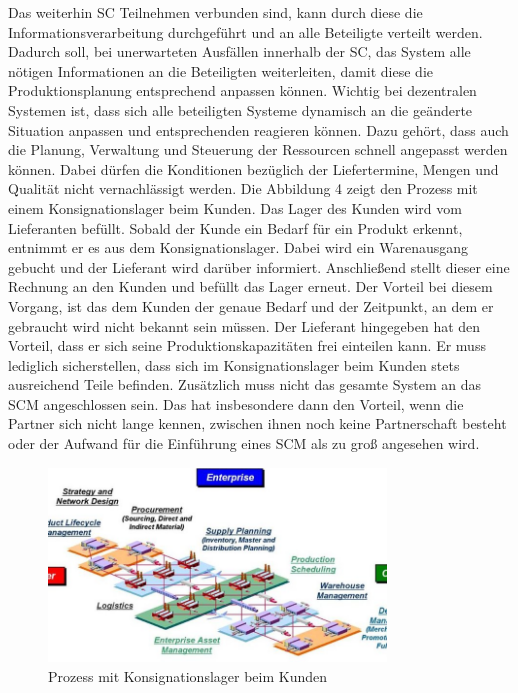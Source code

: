 Das weiterhin \ac{SC} Teilnehmen verbunden sind, kann durch diese die Informationsverarbeitung durchgeführt und an alle Beteiligte verteilt werden. Dadurch soll, bei unerwarteten Ausfällen innerhalb der \ac{SC}, das System alle nötigen Informationen an die Beteiligten weiterleiten, damit diese die Produktionsplanung entsprechend anpassen können.
Wichtig bei dezentralen Systemen ist, dass sich alle beteiligten Systeme dynamisch an die geänderte Situation anpassen und entsprechenden reagieren können. Dazu gehört, dass auch die Planung, Verwaltung und Steuerung der Ressourcen schnell angepasst werden können. Dabei dürfen die Konditionen bezüglich der Liefertermine, Mengen und Qualität nicht vernachlässigt werden.
Die Abbildung 4 zeigt den Prozess mit einem Konsignationslager beim Kunden. Das Lager des Kunden wird vom Lieferanten befüllt. Sobald der Kunde ein Bedarf für ein Produkt erkennt, entnimmt er es aus dem Konsignationslager. Dabei wird ein Warenausgang gebucht und der Lieferant wird darüber informiert. Anschließend stellt dieser eine Rechnung an den Kunden und befüllt das Lager erneut.
Der Vorteil bei diesem Vorgang, ist das dem Kunden der genaue Bedarf und der Zeitpunkt, an dem er gebraucht wird nicht bekannt sein müssen. Der Lieferant hingegeben hat den Vorteil, dass er sich seine Produktionskapazitäten frei einteilen kann. Er muss lediglich sicherstellen, dass sich im Konsignationslager beim Kunden stets ausreichend Teile befinden. Zusätzlich muss nicht das gesamte System an das \ac{SCM} angeschlossen sein. Das hat insbesondere dann den Vorteil, wenn die Partner sich nicht lange kennen, zwischen ihnen noch keine Partnerschaft besteht oder der Aufwand für die Einführung eines \ac{SCM} als zu groß angesehen wird.

\begin{figure}[htbp]
	\centering
	\includegraphics[width=0.8\textwidth]{../pics/scm_komponent}
	\caption{Prozess mit Konsignationslager beim Kunden \cite{scm:grafik_kons_best_kunde_14}}
	\label{fig:kons_prz_kunde}
\end{figure}


